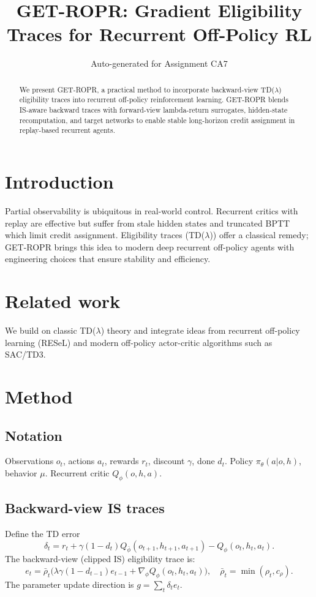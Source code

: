 \documentclass{article}
\title{GET-ROPR: Gradient Eligibility Traces for Recurrent Off-Policy RL}
\author{Auto-generated for Assignment CA7}
\begin{document}
\maketitle

\begin{abstract}
We present GET-ROPR, a practical method to incorporate backward-view
TD($\lambda$) eligibility traces into recurrent off-policy reinforcement learning.
GET-ROPR blends IS-aware backward traces with forward-view lambda-return surrogates,
hidden-state recomputation, and target networks to enable stable long-horizon credit assignment
in replay-based recurrent agents.
\end{abstract}

\section{Introduction}
Partial observability is ubiquitous in real-world control. Recurrent critics with replay
are effective but suffer from stale hidden states and truncated BPTT which limit credit
assignment. Eligibility traces (TD($\lambda$)) offer a classical remedy; GET-ROPR brings
this idea to modern deep recurrent off-policy agents with engineering choices that ensure
stability and efficiency.

\section{Related work}
We build on classic TD($\lambda$) theory \cite{sutton2018reinforcement} and integrate ideas
from recurrent off-policy learning (RESeL) and modern off-policy actor-critic algorithms
such as SAC/TD3.

\section{Method}
\subsection{Notation}
Observations \(o_t\), actions \(a_t\), rewards \(r_t\), discount \(\gamma\), done \(d_t\).
Policy \(\pi_\theta(a|o,h)\), behavior \(\mu\). Recurrent critic \(Q_\phi(o,h,a)\).

\subsection{Backward-view IS traces}
Define the TD error
\[
\delta_t = r_t + \gamma(1-d_t) Q_{\bar\phi}(o_{t+1},h_{t+1},a_{t+1}) - Q_\phi(o_t,h_t,a_t).
\]
The backward-view (clipped IS) eligibility trace is:
\[
e_t = \bar{\rho}_t\big(\lambda\gamma(1-d_{t-1})e_{t-1} + \nabla_\phi Q_\phi(o_t,h_t,a_t)\big),
\quad \bar{\rho}_t = \min(\rho_t, c_\rho).
\]
The parameter update direction is \(g=\sum_t \delta_t e_t\).
\end{document}

